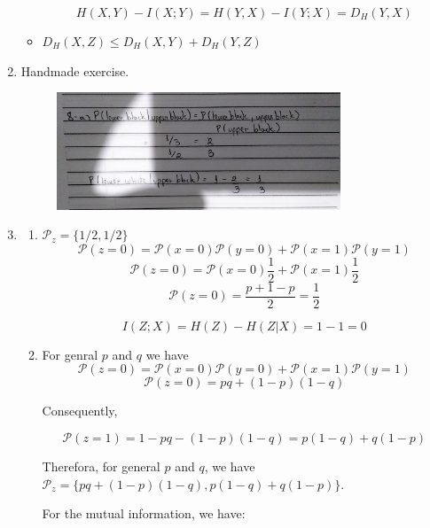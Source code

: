 \documentclass{article}
\begin{document}
\begin{enumerate}
\begin{itemize}
		            \[H(X, Y) - I(X;Y) = H(Y, X) - I(Y; X) = D_H(Y, X)\]
		      \item \(D_H(X, Z) \leq  D_H(X, Y) + D_H(Y, Z)\)
	      \end{itemize}
	\item Handmade exercise.
	      \begin{figure}[H]
		      \centering
		      \includegraphics[width=0.8\textwidth]{images/6.jpg}
	      \end{figure}
	\item
	      \begin{enumerate}
		      \item \(\mathcal{P}_z = \{1/2, 1/2\}\)
		            \[\mathcal{P}(z = 0) = \mathcal{P}(x = 0) \mathcal{P}(y = 0) +\mathcal{P}(x = 1) \mathcal{P}(y = 1)\]
		            \[\mathcal{P}(z = 0) = \mathcal{P}(x = 0) \frac{1}{2} +\mathcal{P}(x = 1) \frac{1}{2}\]
		            \[\mathcal{P}(z = 0) = \frac{p + 1 - p}{2} = \frac{1}{2}\]

		            \[I(Z; X) = H(Z) - H(Z|X) = 1 - 1 = 0\]
		      \item For genral \(p\) and \(q\) we have
		            \[\mathcal{P}(z = 0) = \mathcal{P}(x = 0) \mathcal{P}(y = 0) +\mathcal{P}(x = 1) \mathcal{P}(y = 1)\]
		            \[\mathcal{P}(z = 0) = pq + (1 - p)(1 - q)\]

		            Consequently,

		            \[\mathcal{P}(z=1) = 1 - pq - (1 - p)(1 - q) = p(1 - q) + q(1 - p)\]

		            Therefora, for general \(p\) and \(q\), we have \(\mathcal{P}_z = \{pq + (1 - p)(1 - q), p(1 - q) + q(1 - p)\}\).

		            For the mutual information, we have:


\end{enumerate}
\end{enumerate}
\end{document}
